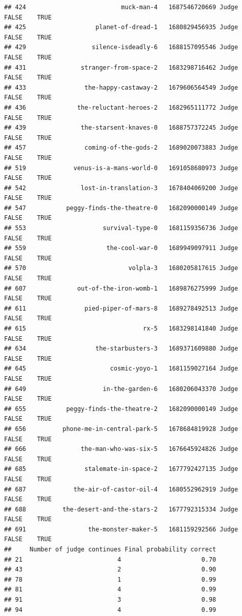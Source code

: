 \documentclass[
]{article}
\begin{document}
\begin{verbatim}
## 424                          muck-man-4   1687546720669 Judge   FALSE    TRUE
## 425                   planet-of-dread-1   1680829456935 Judge   FALSE    TRUE
## 429                  silence-isdeadly-6   1688157095546 Judge   FALSE    TRUE
## 431               stranger-from-space-2   1683298716462 Judge   FALSE    TRUE
## 433                the-happy-castaway-2   1679606564549 Judge   FALSE    TRUE
## 436              the-reluctant-heroes-2   1682965111772 Judge   FALSE    TRUE
## 439               the-starsent-knaves-0   1688757372245 Judge   FALSE    TRUE
## 457                coming-of-the-gods-2   1689020073883 Judge   FALSE    TRUE
## 519             venus-is-a-mans-world-0   1691058680973 Judge   FALSE    TRUE
## 542               lost-in-translation-3   1678404069200 Judge   FALSE    TRUE
## 547           peggy-finds-the-theatre-0   1682090000149 Judge   FALSE    TRUE
## 553                     survival-type-0   1681159356736 Judge   FALSE    TRUE
## 559                      the-cool-war-0   1689949097911 Judge   FALSE    TRUE
## 570                            volpla-3   1680205817615 Judge   FALSE    TRUE
## 607              out-of-the-iron-womb-1   1689876275999 Judge   FALSE    TRUE
## 611                pied-piper-of-mars-8   1689278492513 Judge   FALSE    TRUE
## 615                                rx-5   1683298141840 Judge   FALSE    TRUE
## 634                   the-starbusters-3   1689371609880 Judge   FALSE    TRUE
## 645                       cosmic-yoyo-1   1681159027164 Judge   FALSE    TRUE
## 649                     in-the-garden-6   1680206043370 Judge   FALSE    TRUE
## 655           peggy-finds-the-theatre-2   1682090000149 Judge   FALSE    TRUE
## 656          phone-me-in-central-park-5   1678684819928 Judge   FALSE    TRUE
## 666               the-man-who-was-six-5   1676645924826 Judge   FALSE    TRUE
## 685                stalemate-in-space-2   1677792427135 Judge   FALSE    TRUE
## 687             the-air-of-castor-oil-4   1680552962919 Judge   FALSE    TRUE
## 688          the-desert-and-the-stars-2   1677792315334 Judge   FALSE    TRUE
## 691                 the-monster-maker-5   1681159292566 Judge   FALSE    TRUE
##     Number of judge continues Final probability correct
## 21                          4                      0.70
## 43                          2                      0.90
## 78                          1                      0.99
## 81                          4                      0.99
## 91                          3                      0.98
## 94                          4                      0.99

\end{verbatim}
\end{document}
